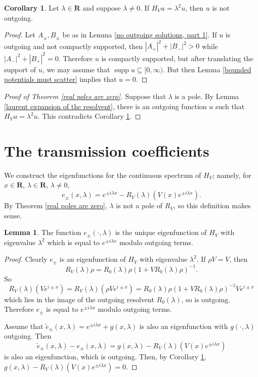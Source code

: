 \documentclass[12pt]{report}
\newcommand{\RR}{\mathbf{R}}
\DeclareMathOperator{\supp}{supp}
\theoremstyle{definition}
\newtheorem{lemma}[theorem]{Lemma}
\newtheorem{corollary}[theorem]{Corollary}
\begin{document}
\begin{corollary}
\label{no outgoing solutions, part 2}
Let $\lambda \in \RR$ and suppose $\lambda \neq 0$. If $H_Vu = \lambda^2u$, then $u$ is not outgoing.
\end{corollary}
\begin{proof}
Let $A_\pm,B_\pm$ be as in Lemma \ref{no outgoing solutions, part 1}. If $u$ is outgoing and not compactly supported, then $|A_+|^2 + |B_-|^2 > 0$ while $|A_-|^2 + |B_+|^2 = 0$. Therefore $u$ is compactly supported, but after translating the support of $u$, we may assume that $\supp u \subseteq [0, \infty)$. But then Lemma \ref{bounded potentials must scatter} implies that $u = 0$.
\end{proof}

\begin{proof}[Proof of Theorem \ref{real poles are zero}]
Suppose that $\lambda$ is a pole. By Lemma \ref{laurent expansion of the resolvent}, there is an outgoing function $u$ such that $H_Vu = \lambda^2u$. This contradicts Corollary \ref{no outgoing solutions, part 2}.
\end{proof}


\section{The transmission coefficients}
We construct the eigenfunctions for the continuous spectrum of $H_V$; namely, for $x \in \RR$, $\lambda \in \RR$, $\lambda \neq 0$,
$$e_\pm(x, \lambda) = e^{\pm i\lambda x} - R_V(\lambda)(V(x)e^{\pm i\lambda x}).$$
By Theorem \ref{real poles are zero}, $\lambda$ is not a pole of $R_V$, so this definition makes sense.
\begin{lemma}
The function $e_\pm(\cdot, \lambda)$ is the unique eigenfunction of $H_V$ with eigenvalue $\lambda^2$ which is equal to $e^{\pm i\lambda x}$ modulo outgoing terms.
\end{lemma}
\begin{proof}
Clearly $e_\pm$ is an eigenfunction of $H_V$ with eigenvalue $\lambda^2$. If $\rho V = V$, then
$$R_V(\lambda)\rho = R_0(\lambda)\rho(1 + VR_0(\lambda)\rho)^{-1}.$$
So
$$R_V(\lambda)(Ve^{i\pm x}) = R_V(\lambda)(\rho Ve^{i\pm x}) = R_0(\lambda)\rho(1 + VR_0(\lambda)\rho)^{-1} Ve^{i\pm x}$$
which lies in the image of the outgoing resolvent $R_0(\lambda)$, so is outgoing. Therefore $e_\pm$ is equal to $e^{\pm i\lambda x}$ modulo outgoing terms.

Assume that $\tilde e_\pm(x, \lambda) = e^{\pm i\lambda x} + g(x, \lambda)$ is also an eigenfunction with $g(\cdot, \lambda)$ outgoing. Then
$$\tilde e_\pm(x, \lambda) - e_\pm(x, \lambda) = g(x, \lambda) - R_V(\lambda)(V(x)e^{\pm i\lambda x})$$
is also an eigenfunction, which is outgoing. Then, by Corollary \ref{no outgoing solutions, part 2}, $g(x, \lambda) - R_V(\lambda)(V(x)e^{\pm i\lambda x}) = 0$.
\end{proof}
\end{document}
